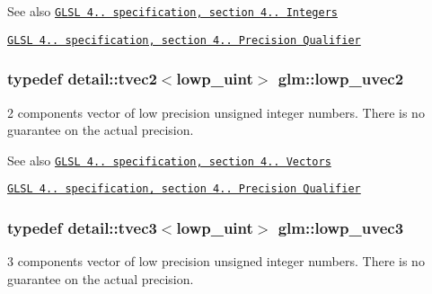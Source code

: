\begin{DoxySeeAlso}{\-See also}
\href{http://www.opengl.org/registry/doc/GLSLangSpec.4.20.8.pdf}{\tt \-G\-L\-S\-L 4.. specification, section 4.. \-Integers} 

\href{http://www.opengl.org/registry/doc/GLSLangSpec.4.20.8.pdf}{\tt \-G\-L\-S\-L 4.. specification, section 4.. \-Precision \-Qualifier} 
\end{DoxySeeAlso}
\hypertarget{group__core__precision_gacae56e02818d0da34e70ac934807388c}{
\subsubsection[{lowp\-\_\-uvec2}]{\setlength{\rightskip}{0pt plus 5cm}typedef detail\-::tvec2$<$lowp\-\_\-uint$>$ {\bf glm\-::lowp\-\_\-uvec2}}}\label{group__core__precision_gacae56e02818d0da34e70ac934807388c}
2 components vector of low precision unsigned integer numbers. \-There is no guarantee on the actual precision.

\begin{DoxySeeAlso}{\-See also}
\href{http://www.opengl.org/registry/doc/GLSLangSpec.4.20.8.pdf}{\tt \-G\-L\-S\-L 4.. specification, section 4.. \-Vectors} 

\href{http://www.opengl.org/registry/doc/GLSLangSpec.4.20.8.pdf}{\tt \-G\-L\-S\-L 4.. specification, section 4.. \-Precision \-Qualifier} 
\end{DoxySeeAlso}
\hypertarget{group__core__precision_ga45a3d9b09e9077ea280d8a1d599c7cae}{
\subsubsection[{lowp\-\_\-uvec3}]{\setlength{\rightskip}{0pt plus 5cm}typedef detail\-::tvec3$<$lowp\-\_\-uint$>$ {\bf glm\-::lowp\-\_\-uvec3}}}\label{group__core__precision_ga45a3d9b09e9077ea280d8a1d599c7cae}
3 components vector of low precision unsigned integer numbers. \-There is no guarantee on the actual precision.

